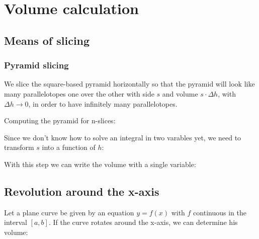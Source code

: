 \documentclass{article}
\begin{document}
\section{Volume calculation}
\subsection{Means of slicing}
\subsubsection{Pyramid slicing}
We slice the square-based pyramid horizontally so that the pyramid will look like
many parallelotopes one over the other with side $s$ and volume $s \cdot \Delta h$,
with $\Delta h \to 0$, in order to have infinitely many parallelotopes.

Computing the pyramid for n-slices:

Since we don't know how to solve an integral in two varables yet,
we need to transform $s$ into a function of $h$:

With this step we can write the volume with a single variable:


\newpage
\subsection{Revolution around the x-axis}
Let a plane curve be given by an equation $y=f(x)$ with $f$ continuous
in the interval $[a,b]$. If the curve rotates around the x-axis, we can
determine his volume:
\end{document}

